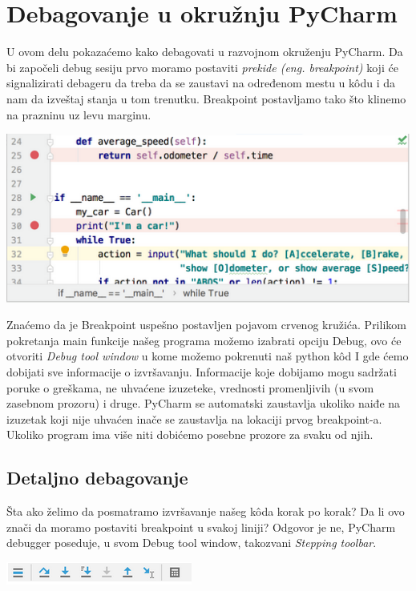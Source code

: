 \documentclass[a4paper]{article}
\begin{document}
\section{Debagovanje u okružnju PyCharm}
U ovom delu pokazaćemo kako debagovati u razvojnom okruženju PyCharm. Da bi započeli debug sesiju prvo moramo postaviti \emph{prekide (eng. breakpoint)} koji će signalizirati debageru  da treba da se zaustavi na određenom mestu u k\^{o}du i da nam da izveštaj stanja u tom trenutku. Breakpoint postavljamo tako što klinemo na prazninu uz levu marginu.

\includegraphics[scale = 0.4]{1}

Znaćemo da je Breakpoint uspešno postavljen pojavom crvenog kružića. Prilikom pokretanja main funkcije našeg programa možemo izabrati opciju Debug, ovo će otvoriti \emph{Debug tool window} u kome možemo pokrenuti naš python k\^{o}d I gde ćemo dobijati sve informacije o izvršavanju. Informacije koje dobijamo mogu sadržati poruke o greškama, ne uhvaćene izuzeteke, vrednosti promenljivih (u svom zasebnom prozoru) i druge. PyCharm se automatski zaustavlja ukoliko naiđe na izuzetak koji nije uhvaćen inače se zaustavlja na lokaciji prvog breakpoint-a. Ukoliko program ima više niti dobićemo posebne prozore za svaku od njih.
\subsection{Detaljno debagovanje}
Šta ako želimo da posmatramo izvršavanje našeg k\^{o}da korak po korak? Da li ovo znači da moramo postaviti breakpoint u svakoj liniji? Odgovor je ne, PyCharm debugger poseduje, u svom Debug tool window, takozvani \emph{Stepping toolbar}.

\includegraphics[scale = 0.6]{2}
\end{document}
